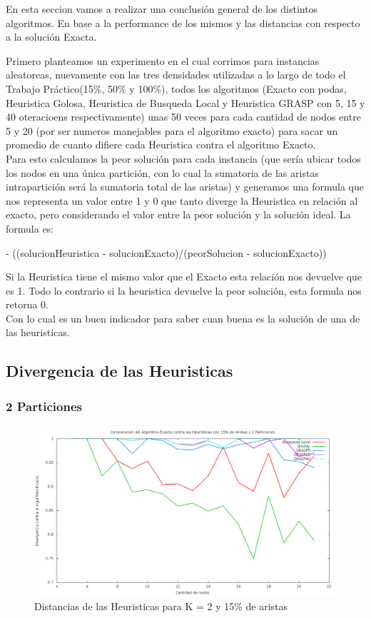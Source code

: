 En esta seccion vamos a realizar una conclusi\'on general de los distintos algoritmos. En base a la performance de los mismos y las distancias con respecto a la soluci\'on Exacta.

Primero planteamos un experimento en el cual corrimos para instancias aleatoreas, nuevamente con las tres densidades utilizadas a lo largo de todo el Trabajo Pr\'actico(15\%, 50\% y 100\%), todos los algoritmos (Exacto con podas, Heuristica Golosa, Heuristica de Busqueda Local y Heuristica GRASP con 5, 15 y 40 oteracioens respectivamente) unas 50 veces para cada cantidad de nodos entre 5 y 20 (por ser numeros manejables para el algoritmo exacto) para sacar un promedio de cuanto difiere cada Heuristica contra el algoritmo Exacto.\\
Para esto calculamos la peor soluci\'on para cada instancia (que ser\'ia ubicar todos los nodos en una \'unica partici\'on, con lo cual la sumatoria de las aristas intrapartici\'on ser\'a la sumatoria total de las aristas) y generamos una formula que nos representa un valor entre 1 y 0 que tanto diverge la Heuristica en relaci\'on al exacto, pero considerando el valor entre la peor soluci\'on y la soluci\'on ideal.
La formula es: 

 - ((solucionHeuristica - solucionExacto)/(peorSolucion - solucionExacto))
\ec

Si la Heuristica tiene el mismo valor que el Exacto esta relaci\'on nos devuelve que es 1. Todo lo contrario si la heuristica devuelve la peor soluci\'on, esta formula nos retorna 0.\\
Con lo cual es un buen indicador para saber cuan buena es la soluci\'on de una de las heuristicas.

\subsection{Divergencia de las Heuristicas}

\subsubsection{2 Particiones}

\begin{figure}[H]
\begin{center}
\includegraphics[scale=0.3]{finales/ComparacionesCon2Particiones15Aristas.png}
\caption{Distancias de las Heuristicas para K = 2 y 15\% de aristas}
\end{center}
\end{figure}

